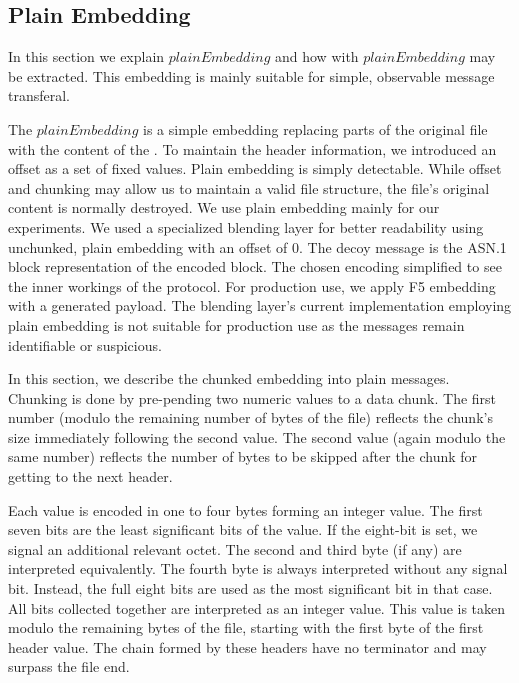 \subsection{Plain Embedding}
In this section we explain $plainEmbedding$ and how \VortexMessages{} with $plainEmbedding$ may be extracted. This embedding is mainly suitable for simple, observable message transferal.

The $plainEmbedding$ is a simple embedding replacing parts of the original file with the content of the \VortexMessage. To maintain the header information, we introduced an offset as a set of fixed values. Plain embedding is simply detectable. While offset and chunking may allow us to maintain a valid file structure, the file's original content is normally destroyed. We use plain embedding mainly for our experiments. We used a specialized blending layer for better readability using unchunked, plain embedding with an offset of $0$. The decoy message is the ASN.1 block representation of the encoded block. The chosen encoding simplified to see the inner workings of the protocol. For production use, we apply F5 embedding with a generated payload. The blending layer's current implementation employing plain embedding is not suitable for production use as the messages remain identifiable or suspicious.

\label{sec:chunkingPlain}
In this section, we describe the chunked embedding into plain messages. Chunking is done by pre-pending two numeric values to a data chunk. The first number (modulo the remaining number of bytes of the file) reflects the chunk's size immediately following the second value. The second value (again modulo the same number)  reflects the number of bytes to be skipped after the chunk for getting to the next header.

Each value is encoded in one to four bytes forming an integer value. The first seven bits are the least significant bits of the value. If the eight-bit is set, we signal an additional relevant octet. The second and third byte (if any) are interpreted equivalently. The fourth byte is always interpreted without any signal bit. Instead, the full eight bits are used as the most significant bit in that case. All bits collected together are interpreted as an integer value. This value is taken modulo the remaining bytes of the file, starting with the first byte of the first header value. The chain formed by these headers have no terminator and may surpass the file end.

